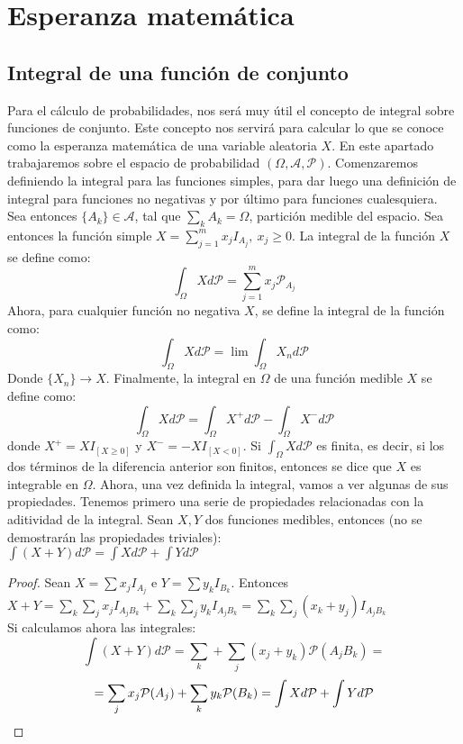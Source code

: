 \section{Esperanza matemática}

\subsection{Integral de una función de conjunto}

Para el cálculo de probabilidades, nos será muy útil el concepto de integral sobre funciones de conjunto. Este concepto nos servirá para calcular lo que se conoce como la esperanza matemática de una variable aleatoria $X$. En este apartado trabajaremos sobre el espacio de probabilidad $(\Omega, \mathcal{A}, \mathcal{P})$. Comenzaremos definiendo la integral para las funciones simples, para dar luego una definición de integral para funciones no negativas y por último para funciones cualesquiera.\\

Sea entonces $\{A_k\} \in \mathcal{A}$, tal que $\displaystyle \sum_k A_k = \Omega$, partición medible del espacio. Sea entonces la función simple $X = \displaystyle \sum_{j=1}^m x_jI_{A_j},\ x_j \geq 0$. La integral de la función $X$ se define como:
$$\int_{\Omega} X d\mathcal{P} = \sum_{j=1}^m x_j\mathcal{P}_{A_j}$$
Ahora, para cualquier función no negativa $X$, se define la integral de la función como:
$$\int_{\Omega} X d\mathcal{P} = \lim \int_{\Omega}X_n d \mathcal{P}$$
Donde $\{X_{n}\} \to X$. Finalmente, la integral en $\Omega$ de una función medible $X$ se define como:
$$\int_{\Omega} X d\mathcal{P} = \int_{\Omega}X^{+} d\mathcal{P} - \int_{\Omega} X^{-} d\mathcal{P}$$
donde $X^{+} = XI_{[X\geq0]}$ y $X^{-} = -XI_{[X<0]}$. Si $\displaystyle \int_{\Omega}Xd\mathcal{P}$ es finita, es decir, si los dos términos de la diferencia anterior son finitos, entonces se dice que $X$ es integrable en $\Omega$. Ahora, una vez definida la integral, vamos a ver algunas de sus propiedades. Tenemos primero una serie de propiedades relacionadas con la aditividad de la integral. Sean $X,Y$ dos funciones medibles, entonces (no se demostrarán las propiedades triviales):\\

$\displaystyle \int (X+Y)d\mathcal{P} = \int Xd\mathcal{P} + \int Yd\mathcal{P}$\\

\begin{proof}

Sean $X = \displaystyle \sum x_jI_{A_j}$ e $Y = \displaystyle \sum y_kI_{B_k}$. Entonces $X+Y = \displaystyle \sum_k \sum_j x_j I_{A_jB_k} + \sum_k \sum_j y_k I_{A_jB_k} = \sum_k \sum_j (x_k+y_j) I_{A_jB_k}$\\

Si calculamos ahora las integrales:
$$ \int (X+Y)d\mathcal{P} = \sum_k + \sum_j (x_j + y_k) \mathcal{P}(A_jB_k) =$$
$$ = \sum_j x_j \mathcal{P}(A_j) + \sum_k y_k \mathcal{P}(B_k) = \int Xd\mathcal{P} + \int Yd\mathcal{P}\\$$

\end{proof}

